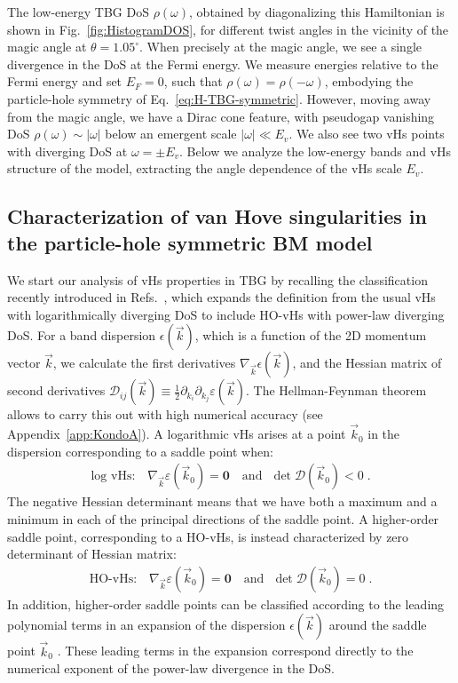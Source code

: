 The low-energy TBG DoS $\rho(\omega)$, obtained by diagonalizing this Hamiltonian is shown in Fig.~\ref{fig:HistogramDOS}, for different twist angles in the vicinity of the magic angle at $\theta=1.05^{\circ}$. When precisely at the magic angle, we see a single divergence in the DoS at the Fermi energy. We measure energies relative to the Fermi energy and set $E_F=0$, such that $\rho(\omega)=\rho(-\omega)$, embodying the particle-hole symmetry of Eq.~\eqref{eq:H-TBG-symmetric}. However, moving away from the magic angle, we have a Dirac cone feature, with pseudogap vanishing DoS $\rho(\omega)\sim |\omega|$ below an emergent scale $|\omega|\ll E_v$. We also see two vHs points with diverging DoS at $\omega=\pm E_v$. Below we analyze the low-energy bands and vHs structure of the model, extracting the angle dependence of the vHs scale $E_v$.


\subsection{Characterization of van Hove singularities in the particle-hole symmetric BM model}

We start our analysis of vHs properties in TBG by recalling the classification recently introduced in Refs.~\cite{Yuan2019,Chamon2020PRR,Yuan2020PRB-classification}, which expands the definition from the usual vHs with logarithmically diverging DoS  \cite{vanHove1953} to include HO-vHs with power-law diverging DoS. For a band dispersion $\epsilon(\vec{k})$, which is a function of the 2D momentum vector $\vec{k}$, we calculate the first derivatives $\nabla_{\vec{k}}\epsilon(\vec{k})$, and the Hessian matrix of second derivatives $\mathcal{D}_{i j}(\vec{k}) \equiv \frac{1}{2} \partial_{k_i} \partial_{k_j} \varepsilon(\vec{k})$. The Hellman-Feynman theorem allows to carry this out with high numerical accuracy (see Appendix~\ref{app:KondoA}). 
A logarithmic vHs arises at a point $\vec{k}_0$ in the dispersion corresponding to a saddle point when:
\begin{align}\label{eq:logvhs}
	\text{log vHs:}\quad \nabla_{\vec{k}}  \varepsilon(\vec{k}_0)=\mathbf{0} \text {~~~and~~} \operatorname{det} \mathcal{D}(\vec{k}_0)<0 \;.
\end{align}
The negative Hessian determinant means that we have both a maximum and a minimum in each of the principal directions of the saddle point. A higher-order saddle point, corresponding to a HO-vHs, is instead characterized by zero determinant of Hessian matrix:
\begin{align}\label{eq:hovhs}
	\text{HO-vHs:}\quad \nabla_{\vec{k}}  \varepsilon(\vec{k}_0)=\mathbf{0} \text {~~~and~~} \operatorname{det} \mathcal{D}(\vec{k}_0)=0 \;.
\end{align}
In addition, higher-order saddle points can be classified according to the leading polynomial terms in an expansion of the dispersion $\epsilon(\vec{k})$ around the saddle point $\vec{k}_0$ \cite{Chamon2020PRR,Yuan2020PRB-classification}. These leading terms in the expansion correspond directly to the numerical exponent of the power-law divergence in the DoS.


